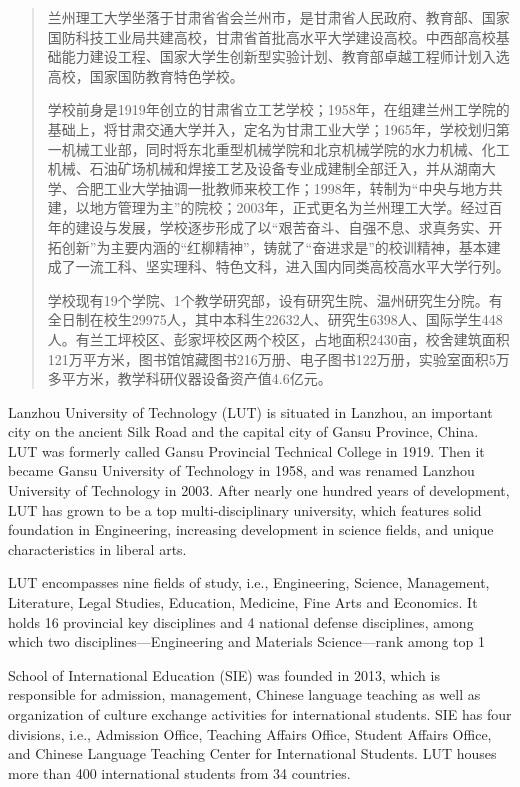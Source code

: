 \begin{abstract}
兰州理工大学坐落于甘肃省省会兰州市，是甘肃省人民政府、教育部、国家国防科技工业局共建高校，甘肃省首批高水平大学建设高校。中西部高校基础能力建设工程、国家大学生创新型实验计划、教育部卓越工程师计划入选高校，国家国防教育特色学校。

学校前身是1919年创立的甘肃省立工艺学校；1958年，在组建兰州工学院的基础上，将甘肃交通大学并入，定名为甘肃工业大学；1965年，学校划归第一机械工业部，同时将东北重型机械学院和北京机械学院的水力机械、化工机械、石油矿场机械和焊接工艺及设备专业成建制全部迁入，并从湖南大学、合肥工业大学抽调一批教师来校工作；1998年，转制为“中央与地方共建，以地方管理为主”的院校；2003年，正式更名为兰州理工大学。经过百年的建设与发展，学校逐步形成了以“艰苦奋斗、自强不息、求真务实、开拓创新”为主要内涵的“红柳精神”，铸就了“奋进求是”的校训精神，基本建成了一流工科、坚实理科、特色文科，进入国内同类高校高水平大学行列。

学校现有19个学院、1个教学研究部，设有研究生院、温州研究生分院。有全日制在校生29975人，其中本科生22632人、研究生6398人、国际学生448人。有兰工坪校区、彭家坪校区两个校区，占地面积2430亩，校舍建筑面积121万平方米，图书馆馆藏图书216万册、电子图书122万册，实验室面积5万多平方米，教学科研仪器设备资产值4.6亿元。
\end{abstract}

\begin{enabstract}
Lanzhou University of Technology (LUT) is situated in Lanzhou, an important city on the ancient Silk Road and the capital city of Gansu Province, China. LUT was formerly called Gansu Provincial Technical College in 1919. Then it became Gansu University of Technology in 1958, and was renamed Lanzhou University of Technology in 2003. After nearly one hundred years of development, LUT has grown to be a top multi-disciplinary university, which features solid foundation in Engineering, increasing development in science fields, and unique characteristics in liberal arts.

LUT encompasses nine fields of study, i.e., Engineering, Science, Management, Literature, Legal Studies, Education, Medicine, Fine Arts and Economics. It holds 16 provincial key disciplines and 4 national defense disciplines, among which two disciplines—Engineering and Materials Science—rank among top 1%

School of International Education (SIE) was founded in 2013, which is responsible for admission, management, Chinese language teaching as well as organization of culture exchange activities for international students. SIE has four divisions, i.e., Admission Office, Teaching Affairs Office, Student Affairs Office, and Chinese Language Teaching Center for International Students. LUT houses more than 400 international students from 34 countries.
\end{enabstract}